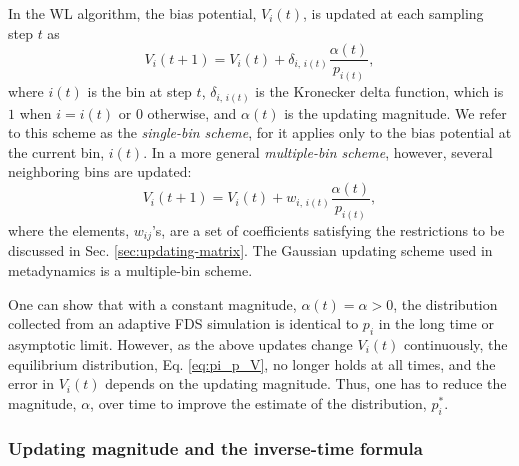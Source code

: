 \documentclass[reprint, superscriptaddress, floatfix]{revtex4-1}
\begin{document}
%
In the WL algorithm\cite{wang2001, *wang2001pre},
the bias potential, $V_i(t)$, is updated
at each sampling step $t$ as
%
\begin{equation}
  V_i(t+1)
  =
  V_i(t)
  +
  \delta_{i, \, i(t)}
  \frac{ \alpha(t) } { p_{i(t)} }
  ,
\label{eq:wl_update}
\end{equation}
%
where $i(t)$ is the bin at step $t$,
$\delta_{i, \, i(t)}$ is the Kronecker delta function,
which is $1$ when $i = i(t)$ or $0$ otherwise,
and $\alpha(t)$ is the updating magnitude.
%
We refer to this scheme as the \emph{single-bin scheme},
for it applies only to the bias potential
at the current bin, $i(t)$.
%
In a more general \emph{multiple-bin scheme}, however,
several neighboring bins are updated:
%
\begin{equation}
  V_i(t+1)
  =
  V_i(t)
  +
  w_{i, \, i(t)}
  \frac{ \alpha(t) }
       { p_{i(t)} },
  \label{eq:mbin_update}
\end{equation}
%
where the elements, $w_{ij}$'s, are a set of coefficients satisfying
the restrictions to be discussed
in Sec. \ref{sec:updating-matrix}.
%
The Gaussian updating scheme
used in metadynamics
is a multiple-bin scheme.



One can show that with a constant magnitude,
$\alpha(t) = \alpha > 0$,
the distribution collected from
an adaptive FDS simulation
is identical to $p_i$ in the long time or asymptotic limit.
%
However, as the above updates
change $V_i(t)$ continuously,
the equilibrium distribution,
Eq. \eqref{eq:pi_p_V}, no longer holds
at all times,
and the error in $V_i(t)$
depends on the updating magnitude\cite{
  belardinelli2007, *belardinelli2007jcp, *belardinelli2008, *belardinelli2016,
  zhou2005, morozov2007, zhou2008,
  laio2005, bussi2006, poulain2006, liang2007,
  crespo2010, *atchade2011, *fort2015}.
%
Thus, one has to reduce the magnitude, $\alpha$, over time
to improve the estimate of the distribution,
$p^*_i$. %





\subsubsection{Updating magnitude and the inverse-time formula}
\end{document}
